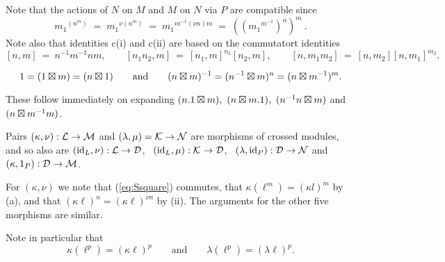 Note that the actions of  $N$  on  $M$  and  $M$  
on  $N$  via  $P$
are compatible since
$$
{m_1}^{(n^m)} \;=\; {m_1}^{\nu(n^m)} \;=\; {m_1}^{m^{-1}(\nu n)m}
\;=\; (({m_1}^{m^{-1}})^n)^m~.
$$
Note also that identities c(i) and c(ii) are based on the commutatort identities 
$$
[n,m] ~=~ n^{-1}m^{-1}nm, \qquad 
[n_1n_2,m] ~=~ [n_1,m]^{n_2}[n_2,m], \qquad 
[n,m_1m_2] ~=~ [n,m_2][n,m_1]^{m_2} .
$$

\begin{lem} 
$$
1 = (1 \boxtimes m) = (n \boxtimes 1 ) 
\qquad\mbox{and}\qquad 
(n \boxtimes m)^{-1} = (n^{-1} \boxtimes m)^n = (n \boxtimes m^{-1})^m. 
$$
\end{lem}
\begin{pf}
These follow immediately on expanding 
$(n.1 \boxtimes m),\ (n \boxtimes m.1),\ (n^{-1}n \boxtimes m)$ and $(n \boxtimes m^{-1}m)$. 
\end{pf}

\begin{lem}
Pairs $(\kappa,\nu) : \mathcal{L} \to \mathcal{M}$ and  $(\lambda,\mu) = \mathcal{K} \to \mathcal{N}$ 
are morphisms of crossed modules, and so also are
$(\mathrm{id}_{L},\nu) : \mathcal{L} \to \mathcal{D}$,~ $(\mathrm{id}_{L},\mu) : \mathcal{K} \to \mathcal{D}$,~
$(\lambda,\mathrm{id}_{P}) : \mathcal{D} \to \mathcal{N}$  and  $(\kappa,1_{P}) : \mathcal{D} \to \mathcal{M}$.
\end{lem}
\begin{pf}
For $(\kappa,\nu)$ we note that (\ref{eq:Ssquare}) commutes,
that  $\kappa(\ell^m) = (\kappa l)^m$  by (a),
and that  $(\kappa \ell)^n = (\kappa \ell)^{\nu n}$  by (ii).
The arguments for the other five morphisms are similar.
\end{pf}

\medskip\noindent
Note in particular that
$$
\kappa(\ell^p) = (\kappa \ell)^p
\qquad \mbox{and} \qquad
\lambda(\ell^p) = (\lambda \ell)^p.
$$

